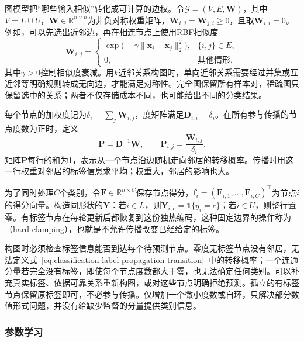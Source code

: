 图模型把“哪些输入相似”转化成可计算的边权。令$\mathcal{G}=(V,E,\bm{W})$，其中$V=L\cup U$，$\bm{W}\in\mathbb{R}^{n\times n}$为非负对称权重矩阵，$\bm{W}_{i,j}=\bm{W}_{j,i}\geq0$，且取$\bm{W}_{i,i}=0$。例如，可以先选出近邻边，再在相连节点上使用RBF相似度
\begin{equation}
  \label{eq:classification-label-propagation-weights}
  \bm{W}_{i,j}=
  \begin{cases}
    \exp\bigl(-\gamma\lVert\bm{x}_i-\bm{x}_j\rVert_2^2\bigr),
      & \{i,j\}\in E,\\
    0, & \text{其他情形},
  \end{cases}
\end{equation}
其中$\gamma>0$控制相似度衰减。用$k$近邻关系构图时，单向近邻关系需要经过并集或互近邻等明确规则转成无向边，才能满足对称性。完全图保留所有样本对，稀疏图只保留选中的关系；两者不仅存储成本不同，也可能给出不同的分类结果。

每个节点的加权度记为$\delta_i=\sum_j\bm{W}_{i,j}$，度矩阵满足$\bm{D}_{i,i}=\delta_i$。在所有参与传播的节点度数为正时，定义
\begin{equation}
  \label{eq:classification-label-propagation-transition}
  \bm{P}=\bm{D}^{-1}\bm{W},
  \qquad
  \bm{P}_{i,j}=\frac{\bm{W}_{i,j}}{\delta_i}.
\end{equation}
矩阵$\bm{P}$每行的和为1，表示从一个节点沿边随机走向邻居的转移概率。传播时用这一行权重对邻居的标签信息求平均；权重大，邻居的影响也大。

为了同时处理$C$个类别，令$\bm{F}\in\mathbb{R}^{n\times C}$保存节点得分，$\bm{f}_i=(\bm{F}_{i,1},\dots,\bm{F}_{i,C})^\top$为节点$i$的得分向量。构造同形状的$\bm{Y}$：若$i\in L$，则$\bm{Y}_{i,c}=\mathbb{1}\{y_i=c\}$；若$i\in U$，则整行置零。有标签节点在每轮更新后都恢复到这份独热编码，这种固定边界的操作称为（hard clamping），也就是不允许传播改变已经给定的标签。

构图时必须检查标签信息能否到达每个待预测节点。零度无标签节点没有邻居，无法定义式~\eqref{eq:classification-label-propagation-transition}~中的转移概率；一个连通分量若完全没有标签，即使每个节点度数都大于零，也无法确定任何类别。可以补充真实标签、依据可靠关系重新构图，或对这些节点明确拒绝预测。孤立的有标签节点保留原标签即可，不必参与传播。仅增加一个微小度数或自环，只解决部分数值形式问题，并没有给缺少监督的分量提供类别信息。

\subsubsection{参数学习}
\label{sec:classification-label-propagation-learning}

